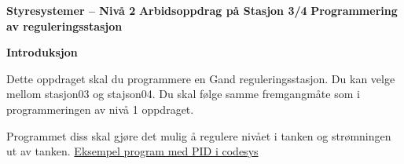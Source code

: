 

\noindent

\vskip 5pt



\vskip 5pt
\begin{center}
\textbf{Styresystemer -- Nivå 2 }
\vskip 5pt 
\textbf{Arbidsoppdrag på Stasjon 3/4}
\vskip 5pt 
\textbf{Programmering av reguleringsstasjon}
\end{center}

\vskip 10pt 
\textbf{Introduksjon}

\vskip 5pt 
Dette oppdraget skal du programmere en Gand reguleringsstasjon. Du kan velge mellom stasjon03 og stajson04. Du skal følge samme fremgangmåte som i programmeringen av nivå 1 oppdraget. 

Programmet diss skal gjøre det mulig å regulere nivået i tanken og strømningen ut av tanken. 
\href{https://rfka-my.sharepoint.com/:u:/g/personal/fred-olav_mosdal_skole_rogfk_no/EewzybzUnq5PscHy_uJUvUMB3ufsOB417mgUkhGlC8yQrg?e=rPkbpf}{Eksempel program med PID i codesys}

\vskip 5pt 

\vskip 5pt 

